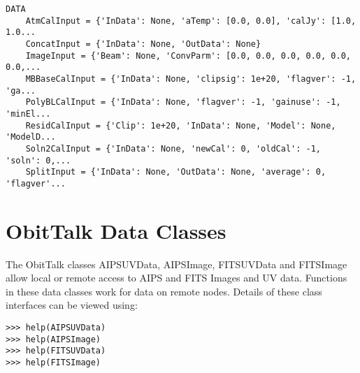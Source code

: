 \documentclass[11pt]{report}
\begin{document}
\begin{verbatim}
DATA
    AtmCalInput = {'InData': None, 'aTemp': [0.0, 0.0], 'calJy': [1.0, 1.0...
    ConcatInput = {'InData': None, 'OutData': None}
    ImageInput = {'Beam': None, 'ConvParm': [0.0, 0.0, 0.0, 0.0, 0.0, 0.0,...
    MBBaseCalInput = {'InData': None, 'clipsig': 1e+20, 'flagver': -1, 'ga...
    PolyBLCalInput = {'InData': None, 'flagver': -1, 'gainuse': -1, 'minEl...
    ResidCalInput = {'Clip': 1e+20, 'InData': None, 'Model': None, 'ModelD...
    Soln2CalInput = {'InData': None, 'newCal': 0, 'oldCal': -1, 'soln': 0,...
    SplitInput = {'InData': None, 'OutData': None, 'average': 0, 'flagver'...
\end{verbatim}

\section{ObitTalk Data Classes}
   The ObitTalk classes  AIPSUVData, AIPSImage, FITSUVData and
FITSImage allow local or remote access to AIPS and FITS Images
and UV data.  
Functions in these data classes work for data on remote nodes.
Details of these class interfaces can be viewed using:
\begin{verbatim}
>>> help(AIPSUVData)
>>> help(AIPSImage)
>>> help(FITSUVData)
>>> help(FITSImage)
\end{verbatim}
\end{document}
